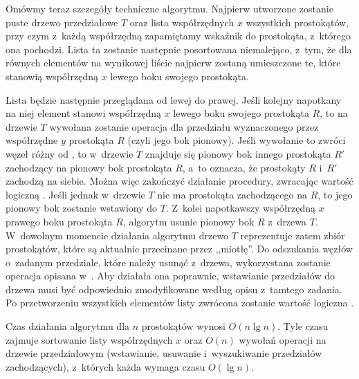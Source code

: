 Omówmy teraz szczegóły techniczne algorytmu.
Najpierw utworzone zostanie puste drzewo przedziałowe $T$ oraz lista współrzędnych $x$ wszystkich prostokątów, przy czym z~każdą współrzędną zapamiętamy wskaźnik do prostokąta, z~którego ona pochodzi.
Lista ta zostanie następnie posortowana niemalejąco, z~tym, że dla równych elementów na wynikowej liście najpierw zostaną umieszczone te, które stanowią współrzędną $x$ lewego boku swojego prostokąta.

Lista będzie następnie przeglądana od lewej do prawej.
Jeśli kolejny napotkany na niej element stanowi współrzędną $x$ lewego boku swojego prostokąta $R$, to na drzewie $T$ wywołana zostanie operacja  dla przedziału wyznaczonego przez współrzędne $y$ prostokąta $R$ (czyli jego bok pionowy).
Jeśli wywołanie to zwróci węzeł różny od , to w~drzewie $T$ znajduje się pionowy bok innego prostokąta $R'$ zachodzący na pionowy bok prostokąta $R$, a~to oznacza, że prostokąty $R$ i~$R'$ zachodzą na siebie.
Można więc zakończyć działanie procedury, zwracając wartość logiczną .
Jeśli jednak w~drzewie $T$ nie ma prostokąta zachodzącego na $R$, to jego pionowy bok zostanie wstawiony do $T$.
Z~kolei napotkawszy współrzędną $x$ prawego boku prostokąta $R$, algorytm usunie pionowy bok $R$ z~drzewa $T$.
W~dowolnym momencie działania algorytmu drzewo $T$ reprezentuje zatem zbiór prostokątów, które są aktualnie przecinane przez ,,miotłę''.
Do odszukania węzłów o~zadanym przedziale, które należy usunąć z~drzewa, wykorzystana zostanie operacja  opisana w~.
Aby działała ona poprawnie, wstawianie przedziałów do drzewa musi być odpowiednio zmodyfikowane według opisu z~tamtego zadania.
Po przetworzeniu wszystkich elementów listy zwrócona zostanie wartość logiczna .

Czas działania algorytmu dla $n$ prostokątów wynosi $O(n\lg n)$.
Tyle czasu zajmuje sortowanie listy współrzędnych $x$ oraz $O(n)$ wywołań operacji na drzewie przedziałowym (wstawianie, usuwanie i~wyszukiwanie przedziałów zachodzących), z~których każda wymaga czasu $O(\lg n)$.
